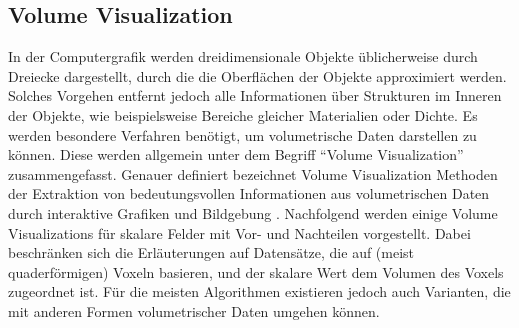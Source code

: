 \documentclass[a4paper,fontsize=12pt,toc=bib,halfparskip]{scrartcl}
\begin{document}
\subsection{Volume Visualization}
In der Computergrafik werden dreidimensionale Objekte \"ublicherweise durch Dreiecke dargestellt, durch die die Oberfl\"achen der Objekte approximiert werden. Solches Vorgehen entfernt jedoch alle Informationen \"uber Strukturen im Inneren der Objekte, wie beispielsweise Bereiche gleicher Materialien oder Dichte. Es werden besondere Verfahren ben\"otigt, um volumetrische Daten darstellen zu k\"onnen. Diese werden allgemein unter dem Begriff ``Volume Visualization'' zusammengefasst. Genauer definiert bezeichnet Volume Visualization Methoden der Extraktion von bedeutungsvollen Informationen aus volumetrischen Daten durch interaktive Grafiken und Bildgebung \cite[S.~127]{kaufman2005overview}. Nachfolgend werden einige Volume Visualizations f\"ur skalare Felder  mit Vor- und Nachteilen vorgestellt. Dabei beschr\"anken sich die Erl\"auterungen auf Datens\"atze, die auf (meist quaderf\"ormigen) Voxeln basieren, und der skalare Wert dem Volumen des Voxels zugeordnet ist. F\"ur die meisten Algorithmen existieren jedoch auch Varianten, die mit anderen Formen volumetrischer Daten umgehen k\"onnen.
\end{document}
